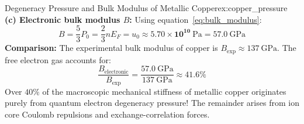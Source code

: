 \documentclass[11pt,a4paper]{article}
\begin{document}
\begin{examplebox}{Degeneracy Pressure and Bulk Modulus of Metallic Copper}{ex:copper_pressure}
\textbf{(c) Electronic bulk modulus $B$:}
Using equation~\eqref{eq:bulk_modulus}:
\[
B = \frac{5}{3}P_0 = \frac{2}{3}n E_F = u_0 \approx \mathbf{5.70 \times 10^{10}\ \mathrm{Pa}} = 57.0\ \mathrm{GPa}
\]
\textbf{Comparison:} The experimental bulk modulus of copper is $B_{\mathrm{exp}} \approx 137\ \mathrm{GPa}$. The free electron gas accounts for:
\[
\frac{B_{\mathrm{electronic}}}{B_{\mathrm{exp}}} = \frac{57.0\ \mathrm{GPa}}{137\ \mathrm{GPa}} \approx \mathbf{41.6\%}
\]
Over $40\%$ of the macroscopic mechanical stiffness of metallic copper originates purely from quantum electron degeneracy pressure! The remainder arises from ion core Coulomb repulsions and exchange-correlation forces.
\end{examplebox}

\vspace{0.4cm}
\end{document}

